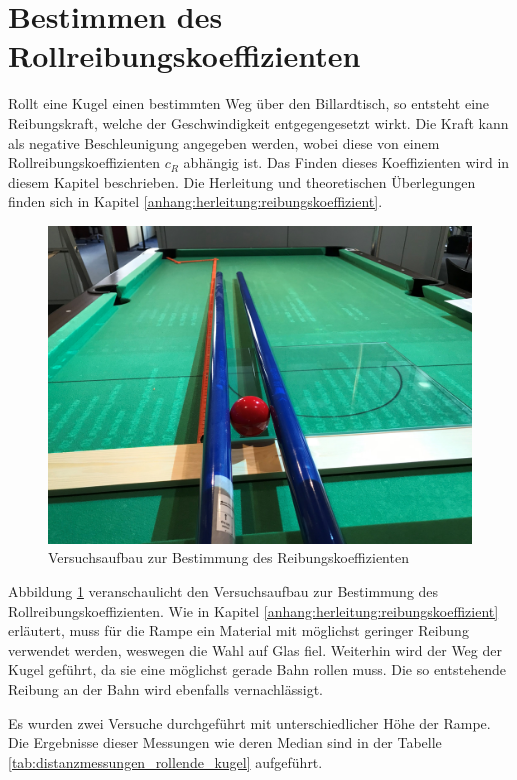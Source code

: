 \section{Bestimmen des Rollreibungskoeffizienten}
Rollt eine Kugel einen bestimmten Weg über den Billardtisch, so entsteht eine Reibungskraft, welche der
Geschwindigkeit entgegengesetzt wirkt. Die Kraft kann als negative Beschleunigung angegeben werden, wobei diese von einem
Rollreibungskoeffizienten $c_R$ abhängig ist. Das Finden dieses Koeffizienten wird in diesem Kapitel beschrieben.
Die Herleitung und theoretischen Überlegungen finden sich in Kapitel \ref{anhang:herleitung:reibungskoeffizient}.

\begin{figure}[h!]
    \begin{center}
        \includegraphics[width=0.5\linewidth]{../common/04_results/resources/00_versuchsaufbau_reibungskoeffizient.png}
    \end{center}
    \caption{Versuchsaufbau zur Bestimmung des Reibungskoeffizienten}
    \label{fig:versuchsaufbau_reibungskoeffizient}
\end{figure}

Abbildung \ref{fig:versuchsaufbau_reibungskoeffizient} veranschaulicht den Versuchsaufbau zur Bestimmung des
Rollreibungskoeffizienten. Wie in Kapitel \ref{anhang:herleitung:reibungskoeffizient} erläutert, muss für die
Rampe ein Material mit möglichst geringer Reibung verwendet werden, weswegen die Wahl auf Glas fiel.
Weiterhin wird der Weg der Kugel geführt, da sie eine möglichst gerade Bahn rollen muss. Die so entstehende Reibung
an der Bahn wird ebenfalls vernachlässigt.

Es wurden zwei Versuche durchgeführt mit unterschiedlicher Höhe der Rampe. Die Ergebnisse dieser Messungen wie
deren Median sind in der Tabelle \ref{tab:distanzmessungen_rollende_kugel} aufgeführt.

